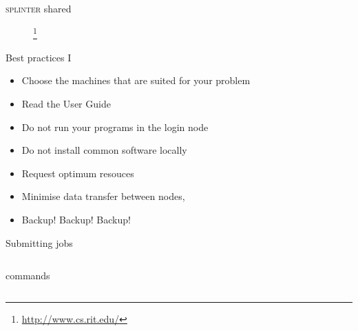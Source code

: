 \documentclass{beamer}
\begin{document}
\begin{frame}{\textsc{splinter} shared}
  \begin{figure}
    \begin{center}
      \footnote{\url{http://www.cs.rit.edu/}}
    \end{center}
  \end{figure}
\end{frame}

\begin{frame}{Best practices I}
  \begin{itemize}
    \item Choose the machines that are suited for your problem
    \item Read the User Guide
    \item Do not run your programs in the login node
    \item Do not install common software locally
    \item Request optimum resouces
    \item Minimise data transfer between nodes,
    \item \alert{Backup! Backup! Backup!}
  \end{itemize}
\end{frame}

\begin{frame}[fragile]{Submitting jobs}
  \fontsize{9pt}{9}\selectfont
  \begin{columns}
    \begin{block}{commands}
      
    \end{block}

    \begin{example}
      
    \end{example}
  \end{columns}
\end{frame}
\end{document}
